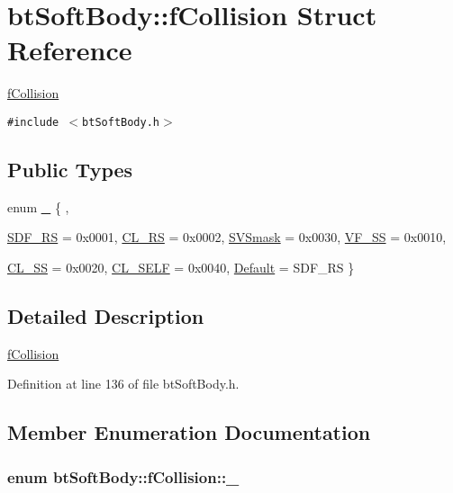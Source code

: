 \hypertarget{structbt_soft_body_1_1f_collision}{
\section{btSoftBody::fCollision Struct Reference}
\label{structbt_soft_body_1_1f_collision}
}
\hyperlink{structbt_soft_body_1_1f_collision}{fCollision}  


{\tt \#include $<$btSoftBody.h$>$}

\subsection*{Public Types}
\begin{CompactItemize}
\item 
enum \hyperlink{structbt_soft_body_1_1f_collision_feb40bef0380b8db7e9e5628cc5f08d5}{\_\-} \{ , \par
\hyperlink{structbt_soft_body_1_1f_collision_feb40bef0380b8db7e9e5628cc5f08d57c057a9cdfcd280d9ec3bf69e09edc62}{SDF\_\-RS} =  0x0001, 
\hyperlink{structbt_soft_body_1_1f_collision_feb40bef0380b8db7e9e5628cc5f08d5f9bbf62b0d36af93b1198eb19d800813}{CL\_\-RS} =  0x0002, 
\hyperlink{structbt_soft_body_1_1f_collision_feb40bef0380b8db7e9e5628cc5f08d5720d2ba3f15fb6ca5c417c5971eb05b6}{SVSmask} =  0x0030, 
\hyperlink{structbt_soft_body_1_1f_collision_feb40bef0380b8db7e9e5628cc5f08d51ad696f1fa631c1256c18a3c8eb18ebc}{VF\_\-SS} =  0x0010, 
\par
\hyperlink{structbt_soft_body_1_1f_collision_feb40bef0380b8db7e9e5628cc5f08d5602caf1ca49fea4d9215dbea6ad17f04}{CL\_\-SS} =  0x0020, 
\hyperlink{structbt_soft_body_1_1f_collision_feb40bef0380b8db7e9e5628cc5f08d571505ee64a4a976707c73ec67cfcd533}{CL\_\-SELF} =  0x0040, 
\hyperlink{structbt_soft_body_1_1f_collision_feb40bef0380b8db7e9e5628cc5f08d51c6fb7a4f36642982c053815889133e5}{Default} =  SDF\_\-RS
 \}
\end{CompactItemize}


\subsection{Detailed Description}
\hyperlink{structbt_soft_body_1_1f_collision}{fCollision} 

Definition at line 136 of file btSoftBody.h.

\subsection{Member Enumeration Documentation}
\hypertarget{structbt_soft_body_1_1f_collision_feb40bef0380b8db7e9e5628cc5f08d5}{
\subsubsection[\_\-]{\setlength{\rightskip}{0pt plus 5cm}enum {\bf btSoftBody::fCollision::\_\-}}}
\label{structbt_soft_body_1_1f_collision_feb40bef0380b8db7e9e5628cc5f08d5}


